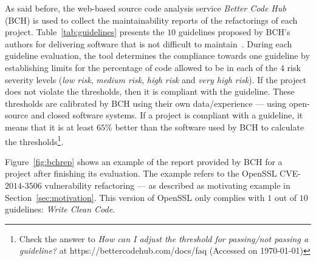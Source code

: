 \documentclass[10pt,conference]{IEEEtran}
\begin{document}
As said before, the web-based source code analysis service \emph{Better Code
Hub} (BCH) is used to collect the maintainability reports of the refactorings of
each project. Table~\ref{tab:guidelines} presents the $10$ guidelines proposed
by BCH's authors for delivering software that is not difficult to
maintain~\cite{Visser:2016:OREILLY}. During each guideline evaluation, the tool
determines the compliance towards one guideline by establishing limits for the
percentage of code allowed to be in each of the $4$ risk severity levels
(\emph{low risk}, \emph{medium risk}, \emph{high risk} and \emph{very high
risk}). If the project does not violate the thresholds, then it is compliant
with the guideline. These thresholds are calibrated by BCH using their own
data/experience --- using open-source and closed software systems. If a project is
compliant with a guideline, it means that it is at least $65\%$ better than the
software used by BCH to calculate the thresholds\footnote{Check the answer to
\emph{How can I adjust the threshold for passing/not passing a guideline?} at
https://bettercodehub.com/docs/faq (Accessed on \today{})}.

Figure~\ref{fig:bchrep} shows an example of the report
provided by BCH for a project after finishing its evaluation. The example
refers to the OpenSSL CVE-$2014$-$3506$ vulnerability refactoring ---
as described as motivating example in Section~\ref{sec:motivation}. This
version of OpenSSL only complies with $1$ out of $10$ guidelines: \emph{Write
Clean Code}.
\end{document}
